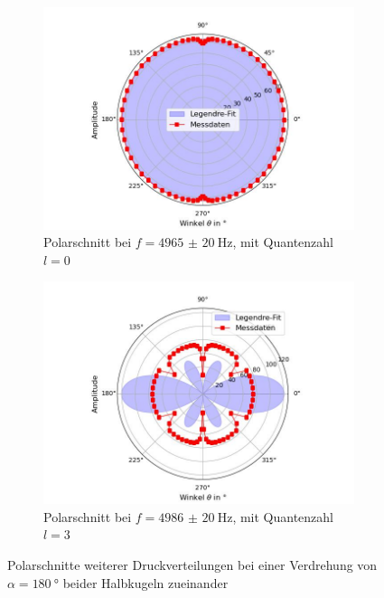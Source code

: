 \documentclass[../main.tex]{subfiles}
\begin{document}
    \begin{figure}[H]
        \centering
        \begin{subfigure}[b]{0.45\textwidth}
            \centering
            \includegraphics[width=\textwidth]{Bilddateien/Auswertung/II_j_Polschnitt_4965_00.jpg}
            \caption{Polarschnitt bei $f=\SI{4965(20)}{\hertz}$, mit Quantenzahl $l=0$}
            \label{fig:II_j_Polschnitt_4965_00}
        \end{subfigure}
        \hfill
        \begin{subfigure}[b]{0.45\textwidth}
            \centering
            \includegraphics[width=\textwidth]{Bilddateien/Auswertung/II_j_Polschnitt_4986_30.jpg}
            \caption{Polarschnitt bei $f=\SI{4986(20)}{\hertz}$, mit Quantenzahl $l=3$}
            \label{fig:II_j_Polschnitt_4986_30}
        \end{subfigure}
        \caption{Polarschnitte weiterer Druckverteilungen bei einer Verdrehung von $\alpha=\SI{180}{\degree}$ beider Halbkugeln zueinander}
        \label{fig:II_j_Polschnitte_5000}
    \end{figure}
\end{document}
